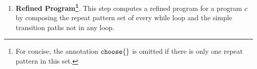 \begin{enumerate}
%
\item \textbf{Refined Program\footnote{For concise, the annotation $\rpchoose{}$ is omitted if there is only one repeat pattern in this set.}}.
This step computes a refined program for a program $c$ by composing the
repeat pattern set of every while loop and the simple transition paths not in any loop.

\end{enumerate}
